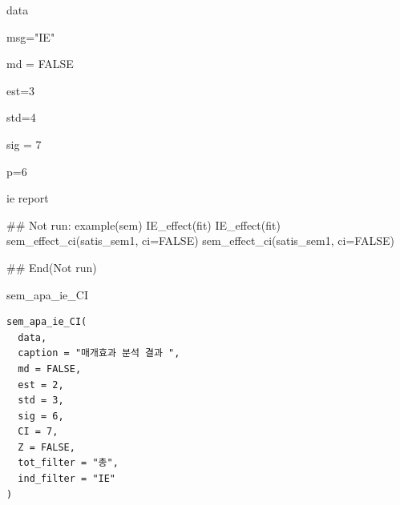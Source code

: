\documentclass[a4paper]{book}
\begin{document}
%
\begin{Arguments}
\begin{ldescription}
\item[\code{data}] data

\item[\code{msg}] msg="IE"

\item[\code{md}] md = FALSE

\item[\code{est}] est=3

\item[\code{std}] std=4

\item[\code{sig}] sig = 7

\item[\code{p}] p=6
\end{ldescription}
\end{Arguments}
%
\begin{Value}
ie report
\end{Value}
%
\begin{Examples}
\begin{ExampleCode}

## Not run: 
example(sem)
IE_effect(fit)
IE_effect(fit) %
sem_effect_ci(satis_sem1, ci=FALSE)
sem_effect_ci(satis_sem1, ci=FALSE)%



## End(Not run)
\end{ExampleCode}
\end{Examples}
%
\begin{Description}
sem\_apa\_ie\_CI
\end{Description}
%
\begin{Usage}
\begin{verbatim}
sem_apa_ie_CI(
  data,
  caption = "매개효과 분석 결과 ",
  md = FALSE,
  est = 2,
  std = 3,
  sig = 6,
  CI = 7,
  Z = FALSE,
  tot_filter = "총",
  ind_filter = "IE"
)
\end{verbatim}
\end{Usage}
%
\end{document}
